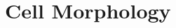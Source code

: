 \documentclass[10pt,a4paper]{article}
\begin{document}

\citep{Ghoshal:1997,GhoshalKim:1997,GhoshalKim:1996,GhoshalKim:1996a,KimGhoshalEtAl:1998}




\section{Cell Morphology}

\begin{landscape}
{\small{}}  
\end{landscape}

\end{document}
